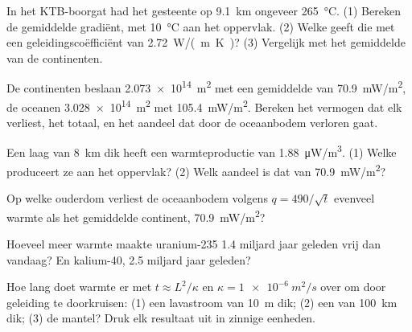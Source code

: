 \begin{exercise}[$\star\star$]\label{exo:g12:internal-heat:6}
In het KTB-boorgat had het gesteente op \qty{9.1}{km} ongeveer \qty{265}{\celsius}.
(1) Bereken de gemiddelde
gradiënt, met \qty{10}{\celsius} aan het oppervlak. (2) Welke 
geeft die met een geleidingscoëfficiënt van \qty{2.72}{W/(m.K)}? (3) Vergelijk met het gemiddelde van de continenten.
\end{exercise}

\begin{exercise}[$\star\star$]\label{exo:g12:internal-heat:7}
De continenten beslaan \qty{2.073e14}{m^2} met een gemiddelde  van
\qty{70.9}{mW/m^2}, de oceanen \qty{3.028e14}{m^2} met
\qty{105.4}{mW/m^2}. Bereken het vermogen dat elk verliest, het totaal, en het aandeel
dat door de oceaanbodem verloren gaat.
\end{exercise}

\begin{exercise}[$\star\star$]\label{exo:g12:internal-heat:8}
Een laag  van \qty{8}{km} dik heeft een warmteproductie van
\qty{1.88}{\micro W/m^3}. (1) Welke  produceert ze aan het oppervlak?
(2) Welk aandeel is dat van \qty{70.9}{mW/m^2}?
\end{exercise}

\begin{exercise}[$\star\star$]\label{exo:g12:internal-heat:9}
Op welke ouderdom verliest de oceaanbodem volgens $q = 490/\sqrt{t}$ evenveel warmte als het gemiddelde continent,
\qty{70.9}{mW/m^2}?
\end{exercise}

\begin{exercise}[$\star\star$]\label{exo:g12:internal-heat:10}
Hoeveel meer warmte maakte uranium-235 1.4 miljard jaar geleden vrij dan
vandaag? En kalium-40, 2.5 miljard jaar geleden?
\end{exercise}

\begin{exercise}[$\star\star$]\label{exo:g12:internal-heat:11}
Hoe lang doet warmte er met $t \approx L^2/\kappa$ en $\kappa = \qty{1e-6}{m^2/s}$ over
om door geleiding te doorkruisen: (1) een lavastroom van \qty{10}{m} dik;
(2) een  van \qty{100}{km} dik; (3) de mantel? Druk elk resultaat
uit in zinnige eenheden.
\end{exercise}

